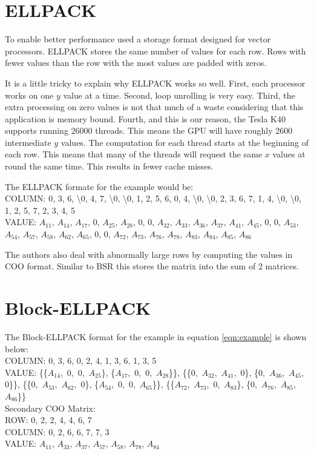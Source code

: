\section{ELLPACK}
\par To enable better performance \cite{prelim:bell} used a storage format designed for vector processors. ELLPACK stores the same number of values for each row. Rows with fewer values than the row with the most values are padded with zeros.
\par It is a little tricky to explain why ELLPACK works so well. First, each processor works on one $y$ value at a time. Second, loop unrolling is very easy. Third, the extra processing on zero values is not that much of a waste considering that this application is memory bound. Fourth, and this is our reason, the Tesla K40 supports running 26000 threads. This means the GPU will have roughly 2600 intermediate $y$ values. The computation for each thread starts at the beginning of each row. This means that many of the threads will request the same $x$ values at round the same time. This results in fewer cache misses.
\par The ELLPACK formate for the example would be:\\
COLUMN: 0, 3, 6, \textbackslash 0, 4, 7, \textbackslash 0, \textbackslash 0, 1, 2, 5, 6, 0, 4, \textbackslash 0, \textbackslash 0, 2, 3, 6, 7, 1, 4, \textbackslash 0, \textbackslash 0, 1, 2, 5, 7, 2, 3, 4, 5\\
VALUE: $A_{11}$, $A_{14}$, $A_{17}$, $0$, $A_{25}$, $A_{28}$, $0$, $0$, $A_{32}$, $A_{33}$, $A_{36}$, $A_{37}$, $A_{41}$, $A_{45}$, $0$, $0$, $A_{53}$, $A_{54}$, $A_{57}$, $A_{58}$, $A_{62}$, $A_{65}$, 0, 0, $A_{72}$, $A_{73}$, $A_{76}$, $A_{78}$, $A_{83}$, $A_{84}$, $A_{85}$, $A_{86}$ \par
The authors also deal with abnormally large rows by computing the values in COO format. Similar to BSR this stores the matrix into the sum of 2 matrices.
\section{Block-ELLPACK}
The Block-ELLPACK format for the example in equation \ref{eqn:example} is shown below:\\
COLUMN: 0, 3, 6, 0, 2, 4, 1, 3, 6, 1, 3, 5\\
VALUE: \{\{$A_{14}$,~$0$,~$0$,~$A_{25}$\}, \{$A_{17}$,~$0$,~$0$,~$A_{28}$\}\},
\{\{$0$,~$A_{32}$,~$A_{41}$,~$0$\}, \{$0$,~$A_{36}$,~$A_{45}$,~$0$\}\},
\{\{$0$,~$A_{53}$,~$A_{62}$,~$0$\}, \{$A_{54}$,~$0$,~$0$,~$A_{65}$\}\},
\{\{$A_{72}$,~$A_{73}$,~$0$,~$A_{83}$\}, \{$0$,~$A_{76}$,~$A_{85}$,~$A_{86}$\}\}\\
Secondary COO Matrix:\\
ROW: 0, 2, 2, 4, 4, 6, 7\\
COLUMN: 0, 2, 6, 6, 7, 7, 3\\
VALUE: $A_{11}$, $A_{33}$, $A_{37}$, $A_{57}$, $A_{58}$, $A_{78}$, $A_{84}$\par
